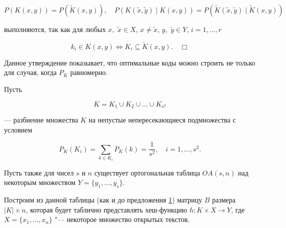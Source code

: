 $$

P(K(x,y)) = P(\widetilde{K}(x,y)),

\quad 

P(K(\widetilde{x},\widetilde{y})  \mid  K(x,y)) = P(\widetilde{K}(\widetilde{x},\widetilde{y})  \mid  \widetilde{K}(x,y))

$$

выполняются, так как для любых $x,$ $\widetilde{x}\in X$, $x\neq \widetilde{x}$, $y,$ $\widetilde{y}\in Y$, $i=1,\dots,r$

$$

k_i\in K(x,y) \Leftrightarrow K_i \subseteq \widetilde{K}(x,y). \quad  \Box

$$





\vskip 0.1in



Данное утверждение показывает, что оптимальные коды можно строить не только для случая, когда $P_K$ равномерно.

Пусть

\begin{equation}

\label{eq_ortog_30}

K = K_1 \cup K_2 \cup \dots \cup K_{s^2}

\end{equation}

--- разбиение множества $K$ на непустые непересекающиеся подмножества с условием

\begin{equation}

\label{eq_ortog_40}

P_{K}(K_i) = \sum_{k\in K_i}P_{K}(k) = \frac{1}{s^2}, \quad i=1,\dots,s^2.

\end{equation}

Пусть также для чисел $s$ и $n$ существует ортогональная таблица $OA(s, n)$ над некоторым множеством $Y=\{y_1,...,y_s\}$.

Построим из данной таблицы (как и до предложения \hyperlink{rats:pr:1}{1}) матрицу $B$ размера $|K|\times n$, которая будет таблично представлять хеш-функцию $h: K\times X \rightarrow Y$, где $X=\{x_1,\dots,x_n\}$ "--- некоторое множество открытых текстов.



\vskip 0.1in



\hypertarget{rats:pr:2}{}

